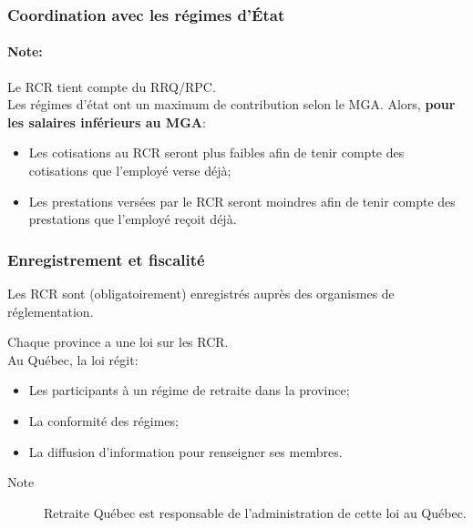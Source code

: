 \documentclass[10pt, french]{article}
\begin{document}
\begin{multicols*}{3}
\subsubsection*{Coordination avec les régimes d'État}
\paragraph{Note:}	Le RCR tient compte du RRQ/RPC.\\

Les régimes d'état ont un maximum de contribution selon le MGA. Alors, \textbf{pour les salaires inférieurs au MGA}:
\begin{itemize}[leftmargin = *]
	\item	Les cotisations au RCR seront plus faibles afin de tenir compte des cotisations que  l'employé verse déjà;
	\item	Les prestations versées par le RCR seront moindres afin de tenir compte des prestations que l'employé reçoit déjà.
\end{itemize}

\subsubsection*{Enregistrement et fiscalité}
Les RCR sont (obligatoirement) enregistrés auprès des organismes de réglementation.

Chaque province a une loi sur les RCR. \\
Au Québec, la loi régit:
\begin{itemize}[leftmargin = *]
	\item	Les participants à un régime de retraite dans la province;
	\item	La conformité des régimes;
	\item	La diffusion d'information pour renseigner ses membres.
\end{itemize}
\begin{description}
	\item[Note]	Retraite Québec est responsable de l'administration de cette loi au Québec. 
\end{description}

\


\end{multicols*}
\end{document}
